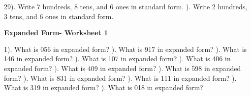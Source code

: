 \documentclass{article}%
\begin{document}
29). Write 7 hundreds, 8 tens, and 6 ones in standard form.%
\newline%
\newline%
). Write 2 hundreds, 3 tens, and 6 ones in standard form.%
\newline%
\newline%
\newline%
\pagebreak%
\large%
\begin{center}%
\textbf{Expanded Form- Worksheet 1}%
\newline%
\end{center} \normalsize%
1). What is 056 in expanded form?%
\newline%
\newline%
). What is 917 in expanded form?%
\newline%
\newline%
). What is 146 in expanded form?%
\newline%
\newline%
). What is 107 in expanded form?%
\newline%
\newline%
). What is 406 in expanded form?%
\newline%
\newline%
). What is 409 in expanded form?%
\newline%
\newline%
). What is 598 in expanded form?%
\newline%
\newline%
). What is 831 in expanded form?%
\newline%
\newline%
). What is 111 in expanded form?%
\newline%
\newline%
). What is 319 in expanded form?%
\newline%
\newline%
). What is 018 in expanded form?%
\newline%
\newline%
\end{document}
